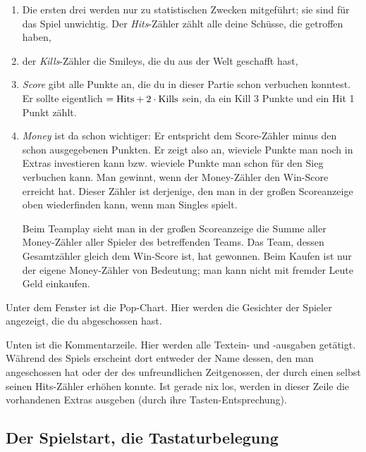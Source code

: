 \documentclass[12pt,twoside]{article}
\begin{document}
\begin{enumerate}

\item Die ersten drei werden nur zu statistischen Zwecken mitgef\"uhrt; sie 
sind f\"ur das Spiel unwichtig. Der {\em Hits}-Z\"ahler z\"ahlt alle deine 
Sch\"usse, die getroffen haben,


\item der {\em Kills}-Z\"ahler die Smileys, die du aus der Welt geschafft 
hast,


\item {\em Score\/} gibt alle Punkte an, die du in dieser Partie schon 
verbuchen konntest. Er sollte eigentlich $= \hbox{Hits} + 2 \cdot 
\hbox{Kills}$ sein, da ein Kill 3 Punkte und ein Hit 1 Punkt z\"ahlt.


\item {\em Money\/} ist da schon wichtiger: Er entspricht dem Score-Z\"ahler 
minus den schon ausgegebenen Punkten. Er zeigt also an, wieviele Punkte man 
noch in Extras investieren kann bzw. wieviele Punkte man schon f\"ur den Sieg 
verbuchen kann. Man gewinnt, wenn der Money-Z\"ahler den Win-Score erreicht 
hat. Dieser Z\"ahler ist derjenige, den man in der gro\ss{}en Scoreanzeige oben 
wiederfinden kann, wenn man Singles spielt.


Beim Teamplay sieht man in der gro\ss{}en Scoreanzeige die Summe aller 
Money-Z\"ahler aller Spieler des betreffenden Teams. Das Team, dessen 
Gesamtz\"ahler gleich dem Win-Score ist, hat gewonnen. Beim Kaufen ist nur der 
eigene Money-Z\"ahler von Bedeutung; man kann nicht mit fremder Leute Geld 
einkaufen.

\end{enumerate}


Unter dem Fenster ist die Pop-Chart. Hier werden die Gesichter der Spieler 
angezeigt, die du abgeschossen hast.


Unten ist die Kommentarzeile. Hier werden alle Textein- und -ausgaben 
get\"atigt. W\"ahrend des Spiels erscheint dort entweder der Name dessen, den 
man angeschossen hat oder der des unfreundlichen Zeitgenossen, der durch 
einen selbst seinen Hits-Z\"ahler erh\"ohen konnte. Ist gerade nix los, werden in
dieser Zeile die vorhandenen Extras ausgeben (durch ihre Tasten-Entsprechung).


\subsection{Der Spielstart, die Tastaturbelegung}
\end{document}
